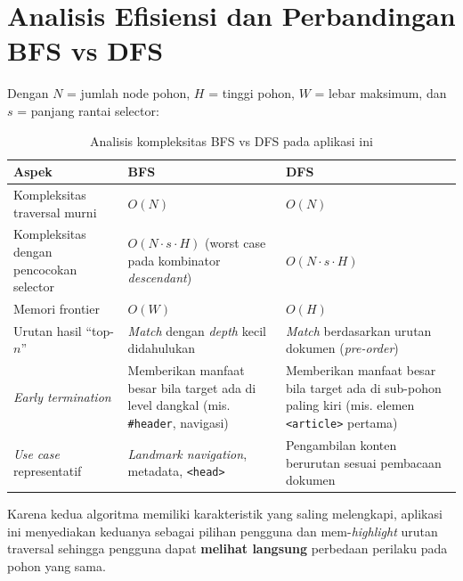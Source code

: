 \section{Analisis Efisiensi dan Perbandingan BFS vs DFS}

Dengan $N$ = jumlah node pohon, $H$ = tinggi pohon, $W$ = lebar maksimum, dan $s$ = panjang rantai selector:

\begin{table}[H]
\centering
\caption{Analisis kompleksitas BFS vs DFS pada aplikasi ini}
\begin{tabularx}{\textwidth}{|l|X|X|}
\hline
\textbf{Aspek} & \textbf{BFS} & \textbf{DFS} \\
\hline
Kompleksitas traversal murni & $O(N)$ & $O(N)$ \\
\hline
Kompleksitas dengan pencocokan selector & $O(N \cdot s \cdot H)$ (worst case pada kombinator \textit{descendant}) & $O(N \cdot s \cdot H)$ \\
\hline
Memori frontier & $O(W)$ & $O(H)$ \\
\hline
Urutan hasil ``top-$n$'' & \textit{Match} dengan \textit{depth} kecil didahulukan & \textit{Match} berdasarkan urutan dokumen (\textit{pre-order}) \\
\hline
\textit{Early termination} & Memberikan manfaat besar bila target ada di level dangkal (mis. \texttt{\#header}, navigasi) & Memberikan manfaat besar bila target ada di sub-pohon paling kiri (mis. elemen \texttt{<article>} pertama) \\
\hline
\textit{Use case} representatif & \textit{Landmark navigation}, metadata, \texttt{<head>} & Pengambilan konten berurutan sesuai pembacaan dokumen \\
\hline
\end{tabularx}
\end{table}

Karena kedua algoritma memiliki karakteristik yang saling melengkapi, aplikasi ini menyediakan keduanya sebagai pilihan pengguna dan mem-\textit{highlight} urutan traversal sehingga pengguna dapat \textbf{melihat langsung} perbedaan perilaku pada pohon yang sama.
